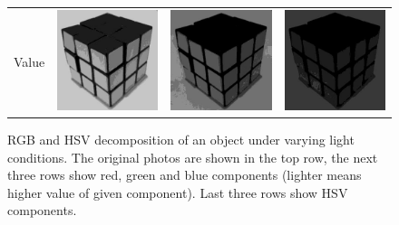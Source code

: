 \begin{figure}
\begin{tabular}{rccc}
         Value &
         \includegraphics[width=\rubiklength]{img/rubik/1_hsv_v.jpg} & 
         \includegraphics[width=\rubiklength]{img/rubik/2_hsv_v.jpg} & \includegraphics[width=\rubiklength]{img/rubik/3_hsv_v.jpg}

    \end{tabular}
    \caption[RGB and HSV decomposition of an object under varying light conditions]{RGB and HSV decomposition of an object under varying light conditions. The original photos are shown in the top row, the next three
    rows show red, green and blue components (lighter means higher value
    of given component). Last three rows show HSV components.}
    \label{fig:rubik_rgb_hsv}
\end{figure}


